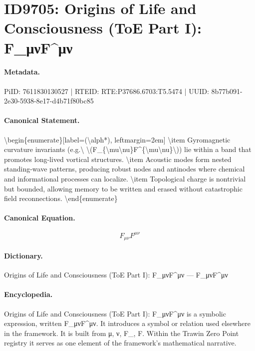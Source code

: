 \section*{ID9705: Origins of Life and Consciousness (ToE Part I): F\_μνF\textasciicircum{}μν}
\paragraph{Metadata.}
PiID: 7611830130527 | RTEID: RTE:P37686.6703:T5.5474 | UUID: 8b77b091-2e30-5938-8e17-d4b71f80bc85

\paragraph{Canonical Statement.}
\textbackslash{}begin\{enumerate\}[label=(\textbackslash{}alph*), leftmargin=2em] \textbackslash{}item Gyromagnetic curvature invariants (e.g.\textbackslash{} \textbackslash{}(F\_\{\textbackslash{}mu\textbackslash{}nu\}F\textasciicircum{}\{\textbackslash{}mu\textbackslash{}nu\}\textbackslash{})) lie within a band that promotes long-lived vortical structures. \textbackslash{}item Acoustic modes form nested standing-wave patterns, producing robust nodes and antinodes where chemical and informational processes can localize. \textbackslash{}item Topological charge is nontrivial but bounded, allowing memory to be written and erased without catastrophic field reconnections. \textbackslash{}end\{enumerate\}

\paragraph{Canonical Equation.}
\[
F_{\mu\nu}F^{\mu\nu}
\]

\paragraph{Dictionary.}
Origins of Life and Consciousness (ToE Part I): F\_μνF\textasciicircum{}μν — F\_μνF\textasciicircum{}μν

\paragraph{Encyclopedia.}
Origins of Life and Consciousness (ToE Part I): F\_μνF\textasciicircum{}μν is a symbolic expression, written F\_μνF\textasciicircum{}μν. It introduces a symbol or relation used elsewhere in the framework. It is built from μ, ν, F\_, F. Within the Trawin Zero Point registry it serves as one element of the framework's mathematical narrative.
